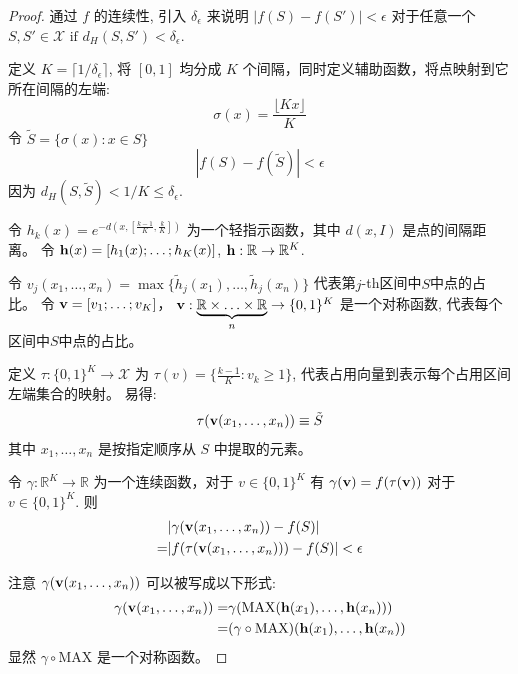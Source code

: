 \begin{proof}
通过 $f$ 的连续性, 引入 $\delta_{\epsilon}$ 来说明 
$|f(S)-f(S')|<\epsilon$ 对于任意一个 $S, S'\in \mathcal{X} \mbox{ if } d_H(S, S')<\delta_{\epsilon}$. 

定义 $K=\lceil 1/\delta_{\epsilon}\rceil$, 将 $[0,1]$ 均分成 $K$ 个间隔，同时定义辅助函数，将点映射到它所在间隔的左端:
$$\sigma(x)=\frac{\lfloor K x \rfloor}{K}$$
令 $\tilde{S}=\{\sigma(x):x\in S\}$
$$|f(S)-f(\tilde{S})|< \epsilon$$
因为 $d_H(S, \tilde{S})<1/K\le \delta_{\epsilon}$.

令 $h_k(x)=e^{-d(x, [\frac{k-1}{K}, \frac{k}{K}])}$ 为一个轻指示函数，其中 $d(x, I)$ 是点的间隔距离。 令 $\mathbf h(x)=[h_1(x); \ldots; h_K(x)]$,  $\mathbf h:\mathbb{R}\rightarrow \mathbb{R}^K$. 

令 $v_j(x_1, \ldots, x_n)=\max\{\tilde{h}_j(x_1),\ldots,\tilde{h}_j(x_n)\}$ 代表第$j$-th区间中$S$中点的占比。 令 $\mathbf v=[v_1;\ldots; v_K]$， $\mathbf v:\underbrace{\mathbb{R}\times \ldots\times \mathbb{R}}_{n}\rightarrow \{0, 1\}^K$ 是一个对称函数, 代表每个区间中$S$中点的占比。

定义 $\tau:\{0, 1\}^K\rightarrow \mathcal{X}$ 为 $\tau(v)=\{\frac{k-1}{K}: v_k\ge 1\}$, 代表占用向量到表示每个占用区间左端集合的映射。 易得:
\begin{align*}
\tau(\mathbf v(x_1, \ldots, x_n))\equiv \tilde{S} 
\end{align*}
其中 $x_1, \ldots, x_n$ 是按指定顺序从 $S$ 中提取的元素。

令 $\gamma:\mathbb{R}^K\rightarrow \mathbb{R}$ 为一个连续函数，对于 $v\in\{0, 1\}^K$ 有 $\gamma(\mathbf v)=f(\tau(\mathbf v))$ 对于 $v\in\{0, 1\}^K$. 则
\begin{align*}
&|\gamma(\mathbf v(x_1, \ldots, x_n))-f(S)|\\
=&|f(\tau(\mathbf v(x_1, \ldots, x_n)))-f(S)|<\epsilon
\end{align*}

注意 $\gamma(\mathbf v(x_1, \ldots, x_n))$ 可以被写成以下形式:
\begin{align*}
\gamma(\mathbf v(x_1, \ldots, x_n))=&\gamma(\mbox{MAX}(\mathbf h(x_1), \ldots, \mathbf h(x_n)))\\
=&(\gamma \circ \mbox{MAX}) (\mathbf h(x_1),\ldots,\mathbf h(x_n))
\end{align*}
显然 $\gamma \circ \mbox{MAX}$ 是一个对称函数。
\end{proof}

